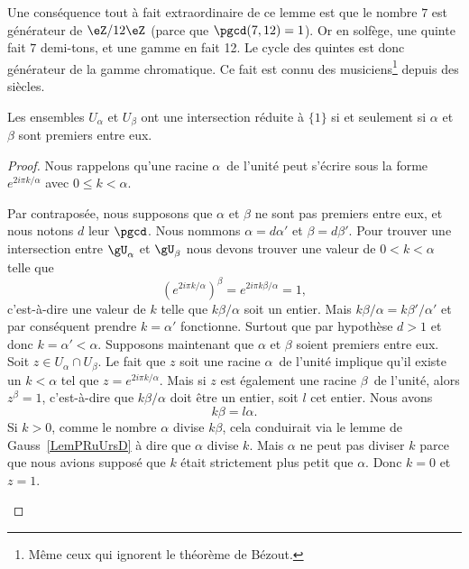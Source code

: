 \begin{example}
	Une conséquence tout à fait extraordinaire de ce lemme est que le nombre \( 7\) est générateur de \( \eZ/12\eZ\) (parce que \( \pgcd(7,12)=1\)). Or en solfège, une quinte fait \( 7\) demi-tons, et une gamme en fait 12. Le cycle des quintes est donc générateur de la gamme chromatique\cite{YDXsAM}. Ce fait est connu des musiciens\footnote{Même ceux qui ignorent le théorème de Bézout.} depuis des siècles.
\end{example}

\begin{proposition}      \label{PROPooIOQEooGMcCJm}
	Les ensembles \( U_{\alpha}\) et \( U_{\beta}\) ont une intersection réduite à \( \{ 1 \}\) si et seulement si \( \alpha\) et \( \beta\) sont premiers entre eux.
\end{proposition}

\begin{proof}
	Nous rappelons qu'une racine \( \alpha\)\ieme\ de l'unité peut s'écrire sous la forme \( e^{2i\pi k/\alpha}\) avec \( 0\leq k<\alpha\).
	\begin{subproof}
		Par contraposée, nous supposons que \( \alpha\) et \( \beta\) ne sont pas premiers entre eux, et nous notons \( d\) leur \( \pgcd\). Nous nommons \( \alpha=d\alpha'\) et \( \beta=d\beta'\). Pour trouver une intersection entre \( \gU_{\alpha}\) et \( \gU_{\beta}\) nous devons trouver une valeur de \( 0<k<\alpha\) telle que
		\begin{equation}
			( e^{2i\pi k/\alpha})^{\beta}= e^{2i\pi k\beta/\alpha}=1,
		\end{equation}
		c'est-à-dire une valeur de \( k\) telle que \( k\beta/\alpha\) soit un entier. Mais \( k\beta/\alpha=k\beta'/\alpha'\) et par conséquent prendre \( k=\alpha'\) fonctionne. Surtout que par hypothèse \( d>1\) et donc \( k=\alpha'<\alpha\).
		Supposons maintenant que \( \alpha\) et \( \beta \) soient premiers entre eux. Soit \( z\in U_{\alpha}\cap U_{\beta}\). Le fait que \( z\) soit une racine \( \alpha\)\ieme\ de l'unité implique qu'il existe un \( k<\alpha\) tel que \( z= e^{2i\pi k/\alpha}\). Mais si \( z\) est également une racine \( \beta\)\ieme\ de l'unité, alors \( z^{\beta}=1\), c'est-à-dire que \( k\beta/\alpha\) doit être un entier, soit \( l\) cet entier. Nous avons
		\begin{equation}
			k\beta=l\alpha.
		\end{equation}
		Si \( k>0\), comme le nombre \( \alpha\) divise \( k\beta\), cela conduirait via le lemme de Gauss~\ref{LemPRuUrsD} à dire que \( \alpha\) divise \( k\). Mais \( \alpha\) ne peut pas diviser \( k\) parce que nous avions supposé que \( k\) était strictement plus petit que \( \alpha\). Donc \( k = 0\) et \( z = 1\).
	\end{subproof}
\end{proof}

